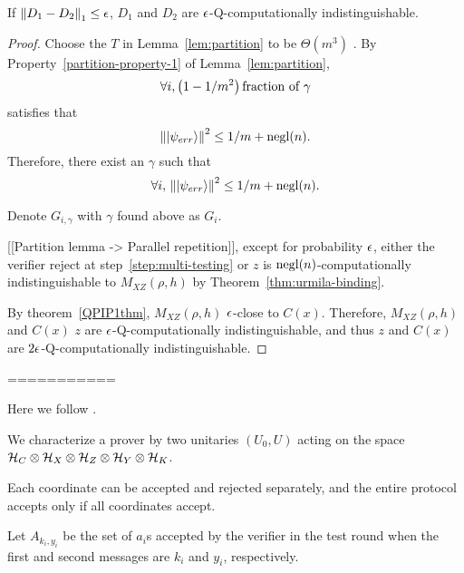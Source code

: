 \begin{rmk}
If $\left\lVert D_1-D_2\right\rVert_1\leq \epsilon$, $D_1$ and $D_2$ are $\epsilon$-Q-computationally indistinguishable.
\end{rmk}



\begin{proof}

Choose the $T$ in Lemma~\ref{lem:partition} to be $\Theta(m^3)$ . By Property~\ref{partition-property-1} of Lemma~\ref{lem:partition}, 
$$\forall i, \left(1- 1/m^2\right)\text{fraction of }\gamma$$ 
satisfies that 
$$\left\lVert\ket{\psi_{err}}\right\rVert^2 \leq 1/m+\operatorname{negl}(n). $$
Therefore, there exist an $\gamma$ such that 
$$\forall i,\, \left\lVert\ket{\psi_{err}}\right\rVert^2 \leq 1/m+\operatorname{negl}(n). $$

Denote $G_{i,\gamma}$ with  $\gamma$ found above as $G_i$.




 [[Partition lemma -> Parallel repetition]], except for probability $\epsilon$, either the verifier reject at step~\ref{step:multi-testing} or $z$ is $\operatorname{negl}(n)$-computationally indistinguishable to $M_{XZ}(\rho,h)$ by Theorem~\ref{thm:urmila-binding}. 
 
 By theorem~\ref{QPIP1thm}, $M_{XZ}(\rho,h)$  $\epsilon$-close to $C(x)$. Therefore, $M_{XZ}(\rho,h)$  and  $C(x)$ $z$ are $\epsilon$-Q-computationally indistinguishable, and thus $z$ and $C(x)$ are  $2\epsilon$-Q-computationally indistinguishable.
 
 
\end{proof}
===========


Here we follow \cite{parallelrep}.

We characterize a prover by two unitaries $(U_0, U)$ acting on the space $\mathcal{H}_C\otimes\mathcal{H}_X\otimes\mathcal{H}_Z\otimes\mathcal{H}_Y\otimes\mathcal{H}_K$.


Each coordinate can be accepted and rejected separately, and the entire protocol accepts only if all coordinates accept.

Let $A_{k_i, y_i}$ be the set of $a_i$s accepted by the verifier in the test round when the first and second messages are $k_i$ and $y_i$, respectively.






